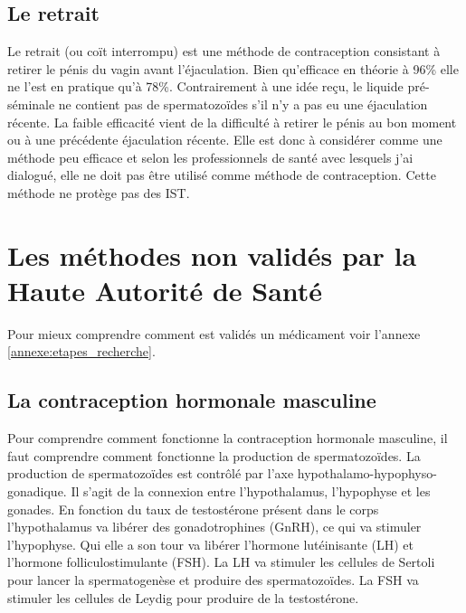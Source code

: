 \documentclass[12pt,a4paper]{report}
\begin{document}
\subsection{Le retrait}

Le retrait (ou coït interrompu) est une méthode de contraception consistant à retirer le pénis du vagin avant l'éjaculation. \cite{CoitInterrompuWikipedia}
Bien qu'efficace en théorie à 96\% elle ne l'est en pratique qu'à 78\%. \cite{TousMoyensContraception2023}
Contrairement à une idée reçu, le liquide pré-séminale ne contient pas de spermatozoïdes s'il n'y a pas eu une éjaculation récente. \cite{freeMaleContraceptionPrescription}
La faible efficacité vient de la difficulté à retirer le pénis au bon moment ou à une précédente éjaculation récente. \cite{CoitInterrompuWikipedia}
Elle est donc à considérer comme une méthode peu efficace et selon les professionnels de santé avec lesquels j'ai dialogué, elle ne doit pas être utilisé comme méthode de contraception.
Cette méthode ne protège pas des IST.

\section{Les méthodes non validés par la Haute Autorité de Santé}

Pour mieux comprendre comment est validés un médicament voir l'annexe \ref{annexe:etapes_recherche}.

\subsection{La contraception hormonale masculine}

Pour comprendre comment fonctionne la contraception hormonale masculine, il faut comprendre comment fonctionne la production de spermatozoïdes.
La production de spermatozoïdes est contrôlé par l'axe hypothalamo-hypophyso-gonadique. Il s'agit de la connexion entre l’hypothalamus, l’hypophyse et les gonades. \cite{HypothalamicPituitaryGonadal2022}
En fonction du taux de testostérone présent dans le corps l'hypothalamus va libérer des gonadotrophines (GnRH), ce qui va stimuler l'hypophyse. Qui elle a son tour va libérer l'hormone lutéinisante (LH) et l'hormone folliculostimulante (FSH).
La LH va stimuler les cellules de Sertoli pour lancer la spermatogenèse et produire des spermatozoïdes. La FSH va stimuler les cellules de Leydig pour produire de la testostérone. \cite{abbeMaleContraception2020}
\end{document}
